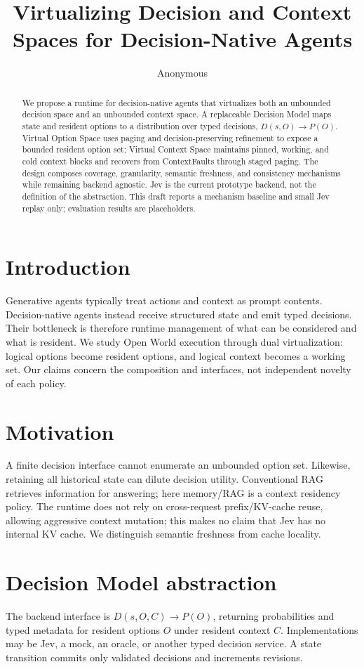 \documentclass[11pt]{article}
\title{Virtualizing Decision and Context Spaces for Decision-Native Agents}\author{Anonymous}\date{}
\begin{document}
\maketitle
\begin{abstract}We propose a runtime for decision-native agents that virtualizes both an unbounded decision space and an unbounded context space. A replaceable Decision Model maps state and resident options to a distribution over typed decisions, $D(s,O)\to P(O)$. Virtual Option Space uses paging and decision-preserving refinement to expose a bounded resident option set; Virtual Context Space maintains pinned, working, and cold context blocks and recovers from ContextFaults through staged paging. The design composes coverage, granularity, semantic freshness, and consistency mechanisms while remaining backend agnostic. Jev is the current prototype backend, not the definition of the abstraction. This draft reports a mechanism baseline and small Jev replay only; evaluation results are placeholders.\end{abstract}
\section{Introduction}Generative agents typically treat actions and context as prompt contents. Decision-native agents instead receive structured state and emit typed decisions. Their bottleneck is therefore runtime management of what can be considered and what is resident. We study Open World execution through dual virtualization: logical options become resident options, and logical context becomes a working set. Our claims concern the composition and interfaces, not independent novelty of each policy.
\section{Motivation}A finite decision interface cannot enumerate an unbounded option set. Likewise, retaining all historical state can dilute decision utility. Conventional RAG retrieves information for answering; here memory/RAG is a context residency policy. The runtime does not rely on cross-request prefix/KV-cache reuse, allowing aggressive context mutation; this makes no claim that Jev has no internal KV cache. We distinguish semantic freshness from cache locality.
\section{Decision Model abstraction}The backend interface is $D(s,O,C)\to P(O)$, returning probabilities and typed metadata for resident options $O$ under resident context $C$. Implementations may be Jev, a mock, an oracle, or another typed decision service. A state transition commits only validated decisions and increments revisions.
\end{document}
